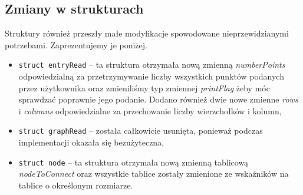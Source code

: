 \documentclass[10pt, a4paper]{report}
\begin{document}
    \subsection{Zmiany w strukturach}
    Struktury również przeszły małe modyfikacje spowodowane nieprzewidzianymi potrzebami. Zaprezentujemy je poniżej.
    \begin{itemize}
        \item \texttt{struct entryRead} -- ta struktura otrzymała nową zmienną \textit{numberPoints} odpowiedzialną za przetrzymywanie liczby
        wszystkich punktów podanych przez użytkownika oraz zmieniliśmy typ zmiennej \textit{printFlag} żeby móc sprawdzać poprawnie jego podanie. Dodano również
        dwie nowe zmienne \textit{rows} i \textit{columns} odpowiedzialne za przechowanie liczby wierzchołków i kolumn,
        
        \item \texttt{struct graphRead} -- została całkowicie usunięta, ponieważ podczas implementacji okazała się bezużyteczna,
        \item \texttt{struct node} -- ta struktura otrzymała nową zmienną tablicową \textit{nodeToConnect} oraz wszystkie tablice zostały zmienione ze wskaźników na tablice o określonym rozmiarze. 
        
    \end{itemize}
\end{document}
